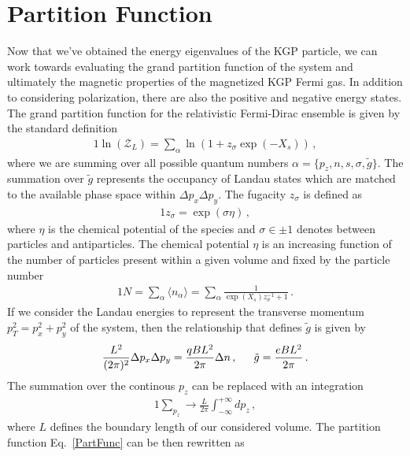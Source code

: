 \documentclass[
aps,
pra,
showpacs,
preprintnumbers,
amsmath,
amssymb,
footinbib
]{revtex4-2}
\newcommand*{\req}[1]{Eq.~{\eqref{#1}}}
\begin{document}
\section{Partition Function}\label{sec:Stats}
\noindent Now that we've obtained the energy eigenvalues of the KGP particle, we can work towards evaluating the grand partition function of the system and ultimately the magnetic properties of the magnetized KGP Fermi gas. In addition to considering polarization, there are also the positive and negative energy states. The grand partition function for the relativistic Fermi-Dirac ensemble is given by the standard definition
\begin{alignat}{1}
    \label{PartFunc} \ln\left(\mathcal{Z}_{L}\right)=\sum_{\alpha}\ln\left(1+z_{\sigma}\exp(-X_{s})\right)\,,
\end{alignat}
where we are summing over all possible quantum numbers $\alpha = \{p_{z},n,s,\sigma,\tilde{g}\}$. The summation over $\tilde{g}$ represents the occupancy of Landau states which are matched to the available phase space within $\Delta p_{x}\Delta p_{y}$. The fugacity $z_{\sigma}$ is defined as
\begin{alignat}{1}
    \label{Fugacity} z_{\sigma}=\exp\left(\sigma\eta\right)\,,
\end{alignat}
where $\eta$ is the chemical potential of the species and $\sigma\in\pm1$ denotes between particles and antiparticles. The chemical potential $\eta$ is an increasing function of the number of particles present within a given volume and fixed by the particle number
\begin{alignat}{1}
  \label{Number} N=\sum_{\alpha}\langle n_{\alpha}\rangle=\sum_{\alpha}\frac{1}{\exp(X_{s})z_{\sigma}^{-1}+1}\,.
\end{alignat}
If we consider the Landau energies to represent the transverse momentum $p_{T}^{2}=p_{x}^{2}+p_{y}^{2}$ of the system, then the relationship that defines $\tilde{g}$ is given by
\begin{alignat}{1}
    \label{PhaseSpace} \frac{L^{2}}{(2\pi)^{2}}\Delta p_{x}\Delta p_{y}=\frac{qBL^{2}}{2\pi}\Delta n\,,\indent \tilde{g}=\frac{eBL^{2}}{2\pi}\,.
\end{alignat}
The summation over the continous $p_{z}$ can be replaced with an integration
\begin{alignat}{1}
    \label{pzInt} \sum_{p_{z}}\rightarrow\frac{L}{2\pi}\int^{+\infty}_{-\infty}dp_{z}\,,
\end{alignat}
where $L$ defines the boundary length of our considered volume. The partition function \req{PartFunc} can be then rewritten as
\end{document}
